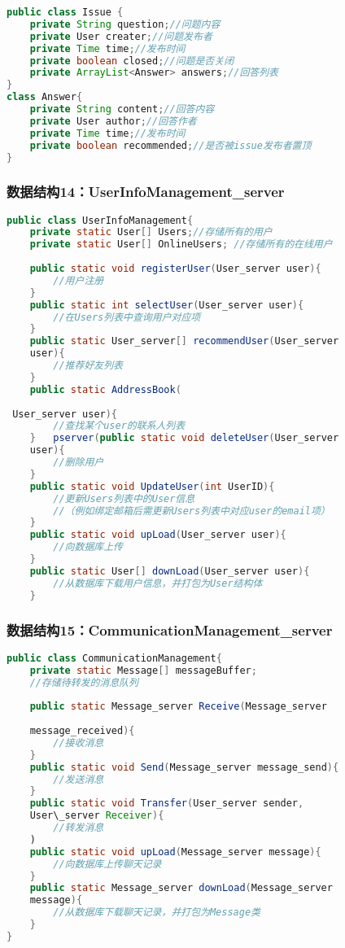 {\begin{lstlisting}[language=Java, caption=Issue定义]
public class Issue {
    private String question;//问题内容
    private User creater;//问题发布者
    private Time time;//发布时间
    private boolean closed;//问题是否关闭
    private ArrayList<Answer> answers;//回答列表
}
class Answer{
    private String content;//回答内容
    private User author;//回答作者
    private Time time;//发布时间
    private boolean recommended;//是否被issue发布者置顶
}
\end{lstlisting}
}




\subsubsection{数据结构14：UserInfoManagement\_server}

\begin{lstlisting}[language=Java, caption=用户信息管理类]
public class UserInfoManagement{
    private static User[] Users;//存储所有的用户
    private static User[] OnlineUsers; //存储所有的在线用户
    
    public static void registerUser(User_server user){
        //用户注册
    }
    public static int selectUser(User_server user){
        //在Users列表中查询用户对应项
    }
    public static User_server[] recommendUser(User_server
    user){
        //推荐好友列表
    }
    public static AddressBook(
    
 User_server user){
        //查找某个user的联系人列表
    }   pserver(public static void deleteUser(User_server 
    user){
        //删除用户
    }
    public static void UpdateUser(int UserID){
        //更新Users列表中的User信息
        //（例如绑定邮箱后需更新Users列表中对应user的email项）
    }
    public static void upLoad(User_server user){
        //向数据库上传
    }
    public static User[] downLoad(User_server user){
        //从数据库下载用户信息，并打包为User结构体
    }
\end{lstlisting}

\subsubsection{数据结构15：CommunicationManagement\_server}
\begin{lstlisting}[language=Java, caption=通讯管理类]
public class CommunicationManagement{
    private static Message[] messageBuffer; 
    //存储待转发的消息队列
    
    public static Message_server Receive(Message_server
    
    message_received){
        //接收消息
    }
    public static void Send(Message_server message_send){
        //发送消息
    }
    public static void Transfer(User_server sender, 
    User\_server Receiver){
        //转发消息
    )
    public static void upLoad(Message_server message){
        //向数据库上传聊天记录
    }
    public static Message_server downLoad(Message_server 
    message){
        //从数据库下载聊天记录，并打包为Message类
    }
}
\end{lstlisting}
